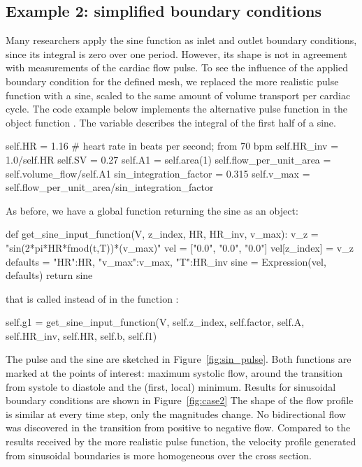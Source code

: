 \subsection{Example 2: simplified boundary conditions}

Many researchers apply the sine function as inlet and outlet boundary
conditions, since its integral is zero over one period. However, its
shape is not in agreement with measurements of the cardiac flow
pulse. To see the influence of the applied boundary condition for the
defined mesh, we replaced the more realistic pulse function with a
sine, scaled to the same amount of volume transport per cardiac
cycle. The code example below implements the alternative pulse
function in the object function . The
variable  describes the integral of the
first half of a sine.
\begin{python}
self.HR = 1.16 # heart rate in beats per second; from 70 bpm
self.HR_inv = 1.0/self.HR
self.SV = 0.27
self.A1 = self.area(1)
self.flow_per_unit_area = self.volume_flow/self.A1
sin_integration_factor = 0.315
self.v_max = self.flow_per_unit_area/sin_integration_factor
\end{python}
As before, we have a global function returning the sine as an object:
\begin{python}
def get_sine_input_function(V, z_index, HR, HR_inv, v_max):
    v_z = "sin(2*pi*HR*fmod(t,T))*(v_max)"
    vel = ["0.0", "0.0", "0.0"]
    vel[z_index] = v_z
    defaults = {"HR":HR, "v_max":v_max, "T":HR_inv}
    sine = Expression(vel, defaults)
    return sine
\end{python}
that is called instead of  in the function :
\begin{python}
self.g1 = get_sine_input_function(V, self.z_index, self.factor, self.A,
                                 self.HR_inv, self.HR, self.b, self.f1)
\end{python}

The pulse and the sine are sketched in
Figure~\ref{fig:sin_pulse}. Both functions are marked at the points of
interest: maximum systolic flow, around the transition from systole to
diastole and the (first, local) minimum. Results for sinusoidal
boundary conditions are shown in Figure~\ref{fig:case2} The shape of
the flow profile is similar at every time step, only the magnitudes
change. No bidirectional flow was discovered in the transition from
positive to negative flow. Compared to the results received by the
more realistic pulse function, the velocity profile generated from
sinusoidal boundaries is more homogeneous over the cross section.


